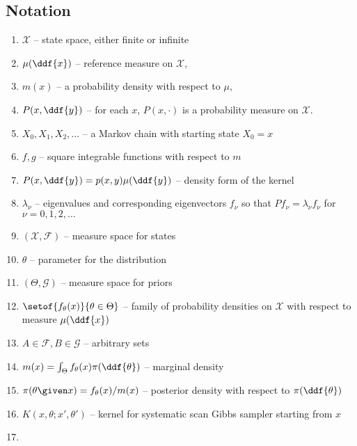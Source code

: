 \documentclass[12pt]{article}
\begin{document}
\subsection*{Notation}
\begin{enumerate}
    \item
        \( \mathcal{X} \) -- state space, either finite or infinite
    \item
        \( \mu(\ddf{x}) \) -- reference measure on \( \mathcal{X} \),
    \item
        \( m(x) \) -- a probability density with respect to \( \mu \),
    \item
        \( P(x, \ddf{y}) \) -- for each \( x \), \( P(x, \cdot) \) is a
        probability measure on \( \mathcal{X} \).
    \item
        \( X_0, X_1, X_2, \dots \) -- a Markov chain with starting state
        \( X_0 = x \)
    \item
        \( f,g \) -- square integrable functions with respect to \( m \)
    \item
        \( P(x,\ddf{y}) = p(x,y)\mu(\ddf{y}) \) -- density form of the
        kernel
    \item
        \( \lambda_{\nu} \) -- eigenvalues and corresponding
        eigenvectors \( f_{\nu} \) so that \( Pf_{\nu} = \lambda_{\nu} f_
        {\nu} \) for \( \nu = 0,1,2, \dots \)
    \item
        \( (\mathcal{X}, \mathcal{F}) \) -- measure space for states
    \item
        \( \theta \) -- parameter for the distribution
    \item
        \( (\Theta, \mathcal{G}) \) -- measure space for priors
    \item
        \( \setof{f_{\theta}(x)}{\theta \in \Theta } \) -- family of
        probability densities on \( \mathcal{X} \) with respect to
        measure \( \mu(\ddf{x}) \)
    \item
        \( A \in \mathcal{F} , B \in \mathcal{G} \) -- arbitrary sets
    \item
        \( m(x) = \int_{\Theta} f_{\theta}(x) \pi(\ddf{\theta}) \) --
        marginal density
    \item
        \( \pi(\theta \given x) = f_{\theta}(x)/m(x) \) -- posterior
        density with respect to \( \pi(\ddf{\theta}) \)
    \item
        \( K(x, \theta; x', \theta') \) -- kernel for systematic scan
        Gibbs sampler starting from \( x \)
    \item

\end{enumerate}
\end{document}
